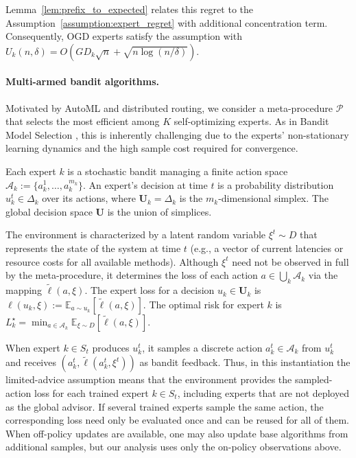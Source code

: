 \documentclass[a4paper,14pt]{extarticle}
\theoremstyle{plain}
\begin{document}
Lemma~\ref{lem:prefix_to_expected} relates this regret to the Assumption~\ref{assumption:expert_regret} with additional concentration term. Consequently, OGD experts satisfy the assumption with
$U_k(n, \delta) = O\left(GD_k\sqrt{n} + \sqrt{n \log(n/\delta)}\right)$.



\paragraph{Multi-armed bandit algorithms.}
Motivated by AutoML and distributed routing, we consider a meta-procedure $\mathcal{P}$ that selects the most efficient among $K$ self-optimizing experts. As in Bandit Model Selection \cite{pacchiano2020model}, this is inherently challenging due to the experts' non-stationary learning dynamics and the high sample cost required for convergence.

Each expert $k$ is a stochastic bandit managing a finite action space $\mathcal{A}_k := \{a_k^1, \dots, a_k^{m_k}\}$. An expert's decision at time $t$ is a probability distribution $u_k^t \in \Delta_k$ over its actions, where $\mathbf{U}_k = \Delta_k$ is the $m_k$-dimensional simplex. The global decision space $\mathbf{U}$ is the union of simplices.


The environment is characterized by a latent random variable $\xi^t \sim D$ that represents the state of the system at time $t$ (e.g., a vector of current latencies or resource costs for all available methods). Although $\xi^t$ need not be observed in full by the meta-procedure, it determines the loss of each action $a \in \bigcup_k \mathcal{A}_k$ via the mapping $\tilde{\ell}(a, \xi)$.
The expert loss for a decision $u_k \in \mathbf{U}_k$ is $\ell(u_k, \xi) := \mathbb{E}_{a \sim u_k} [\tilde{\ell}(a, \xi)]$. The optimal risk for expert $k$ is $L_k^\star = \min_{a \in \mathcal{A}_k} \mathbb{E}_{\xi \sim D} [\tilde{\ell}(a, \xi)]$.

When expert $k\in S_t$ produces $u^{t}_k$, it samples a discrete action $a_k^{t} \in \mathcal{A}_k$ from $u_k^{t}$ and receives $(a^{t}_k, \tilde{\ell}(a^{t}_k, \xi^{t}))$ as bandit feedback. Thus, in this instantiation the limited-advice assumption means that the environment provides the sampled-action loss for each trained expert $k\in S_t$, including experts that are not deployed as the global advisor. If several trained experts sample the same action, the corresponding loss need only be evaluated once and can be reused for all of them. When off-policy updates are available, one may also update base algorithms from additional samples, but our analysis uses only the on-policy observations above.
\end{document}
